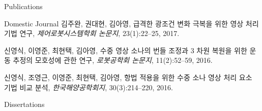 \begin{rSection}{Publications}
\begin{pubSubsection}{Domestic Journal}
    김주완, 권대현, 김아영,
    급격한 광조건 변화 극복을 위한 영상 처리 기법 연구,
    \textit{제어로봇시스템학회 논문지}, 23(1):22--25, 2017.
	
	신영식, 이영준, 최현택, 김아영,
	수중 영상 소나의 번들 조정과 3 차원 복원을 위한 운동 추정의 모호성에 관한 연구,
	\textit{로봇공학회 논문지}, 11(2):52--59, 2016.

	신영식, 조영근, 이영준, 최현택, 김아영,
	항법 적용을 위한 수중 소나 영상 처리 요소 기법 비교 분석,
	\textit{한국해양공학회지}, 30(3):214--220, 2016.
\end{pubSubsection}




\begin{pubSubsection}{Dissertations}
  \item {}
  \item {}
\end{pubSubsection}


\end{rSection}

